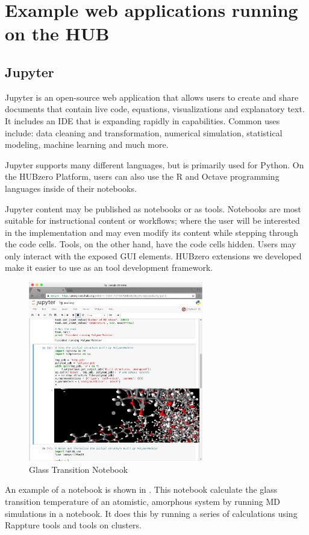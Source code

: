 \documentclass[conference]{../sty/IEEEtran}
\begin{document}
\section {Example web applications running on the HUB}

\subsection {Jupyter}

Jupyter is an open-source web application that allows users to create and share
documents that contain live code, equations, visualizations and explanatory
text. It includes an IDE that is expanding rapidly in capabilities. Common uses
include: data cleaning and transformation, numerical simulation, statistical
modeling, machine learning and much more.

Jupyter supports many different languages, but is primarily used for Python.
On the HUBzero Platform, users can also use the R and Octave programming
languages inside of their notebooks.

Jupyter content may be published as notebooks or as tools.  Notebooks are most
suitable for instructional content or workflows; where the user will be
interested in the implementation and may even modify its content while stepping
through the code cells.  Tools, on the other hand, have the code cells hidden.
Users may only interact with the exposed GUI elements. HUBzero extensions we
developed make it easier to use as an tool development framework.


\begin{figure}[!h]
	\includegraphics[width=3in]{tgnb}
	\caption{Glass Transition Notebook \cite{tg}}
	\label{fig_tg}
\end{figure}

An example of a notebook is shown in .  This notebook calculate
the glass transition temperature of an atomistic, amorphous system by running
MD simulations in a notebook.  It does this by running a series of calculations
using Rappture tools and tools on clusters.
\end{document}
